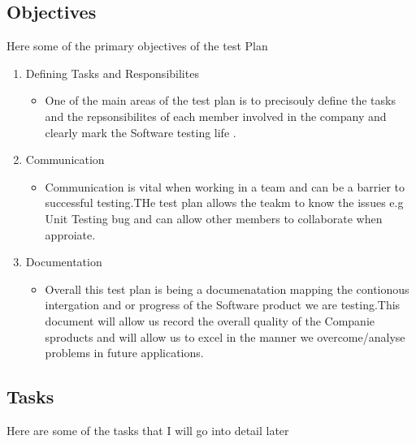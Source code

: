 \subsection{Objectives}
Here some of the primary  objectives of the test Plan
\begin{enumerate}
 
  
	\item Defining Tasks and Responsibilites 
   \begin{itemize}
     \item One of the main areas of the test plan is to precisouly define the tasks and the repsonsibilites of each member involved in the company and clearly mark the Software testing life .
   \end{itemize}


\item Communication 
   \begin{itemize}
     \item Communication is vital when working in a team and can be a barrier to successful testing.THe test plan allows the teakm to know the issues e.g Unit Testing bug and can allow other members to collaborate when approiate.
   \end{itemize}


\item Documentation 
   \begin{itemize}
     \item Overall this test plan is being a documenatation mapping the contionous intergation and or progress of the Software product we are testing.This document will allow us record the overall quality of the Companie sproducts and will allow us to excel in the manner we overcome/analyse problems in future applications. 
   \end{itemize}


   
\end{enumerate}


\subsection{Tasks}
Here are some of the tasks that I will go into detail later


